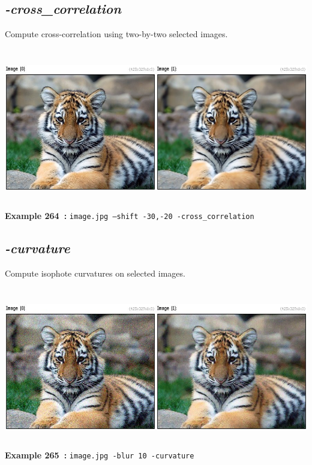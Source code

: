 \documentclass[a4paper,11pt,twoside]{book}
\begin{document}
\subsection{\emph{-cross\_correlation} }\vspace*{-0.5em}
Compute cross-correlation using two-by-two selected images.
\begin{center}\includegraphics[keepaspectratio=true,height=7cm,width=\textwidth]{img/gmic_def264.jpg}\\
{\footnotesize \textbf{Example 264~:} \texttt{image.jpg --shift -30,-20 -cross\_correlation}}
\end{center}

\subsection{\emph{-curvature} }\vspace*{-0.5em}
Compute isophote curvatures on selected images.
\begin{center}\includegraphics[keepaspectratio=true,height=7cm,width=\textwidth]{img/gmic_def265.jpg}\\
{\footnotesize \textbf{Example 265~:} \texttt{image.jpg -blur 10 -curvature}}
\end{center}
\end{document}
